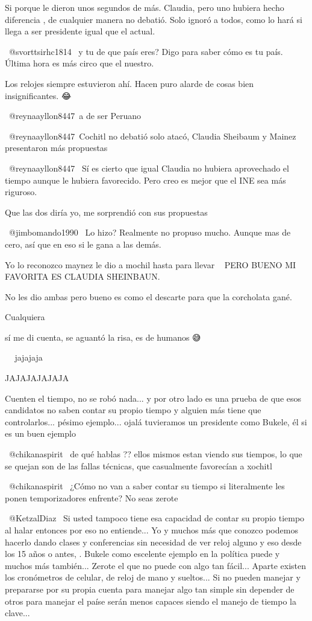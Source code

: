 Si porque le dieron unos segundos de más. Claudia, pero uno hubiera hecho diferencia , de cualquier manera no debatió. Solo ignoró a todos, como lo hará si llega a ser presidente igual que el actual.

 @svorttsirhc1814  y tu de que país eres? Digo para saber cómo es tu país. Última hora es más circo que el nuestro.

Los relojes siempre estuvieron ahí. Hacen puro alarde de cosas bien insignificantes. 😂

​ @reynaayllon8447 a de ser Peruano

​ @reynaayllon8447 Cochitl no debatió solo atacó, Claudia Sheibaum y Mainez presentaron más propuestas

 @reynaayllon8447  Sí es cierto que igual Claudia no hubiera aprovechado el tiempo aunque  le hubiera favorecido. Pero creo es mejor que el INE sea más riguroso.

Que las dos diría yo, me sorprendió con sus propuestas

 @jimbomando1990  Lo hizo? Realmente no propuso mucho. Aunque mas de cero, así que en eso si le gana a las demás.

Yo lo reconozco maynez le dio a mochil hasta para llevar🤣🤣🤣  PERO BUENO MI FAVORITA ES CLAUDIA SHEINBAUN.

No les dio ambas pero bueno es como el descarte para que la corcholata gané.

Cualquiera

sí me di cuenta, se aguantó la risa, es de humanos 😅

🤣🤣🤣 jajajaja

JAJAJAJAJAJA

Cuenten el tiempo, no se robó nada... y por otro lado es una prueba de que esos candidatos no saben contar su propio tiempo y alguien más tiene que controlarlos... pésimo ejemplo... ojalá tuvieramos un presidente como Bukele, él si es un buen ejemplo

 @chikanaspirit  de qué hablas ?? ellos mismos estan viendo sus tiempos, lo que se quejan son de las fallas técnicas, que casualmente favorecían a xochitl

 @chikanaspirit  ¿Cómo no van a saber contar su tiempo si literalmente les ponen temporizadores enfrente? No seas zerote

 @KetzalDiaz  Si usted tampoco tiene esa capacidad de contar su propio tiempo al halar entonces por eso no entiende... Yo y muchos más que conozco podemos hacerlo dando clases y conferencias sin necesidad de ver reloj alguno y eso desde los 15 años o antes, . Bukele como escelente ejemplo en la política puede y muchos más también...  Zerote el que no puede con algo tan fácil... Aparte existen los cronómetros de celular, de reloj de mano y sueltos... Si no pueden manejar y prepararse por su propia cuenta para manejar algo tan simple sin depender de otros para manejar el paíse serán menos capaces siendo el manejo de tiempo la clave...

